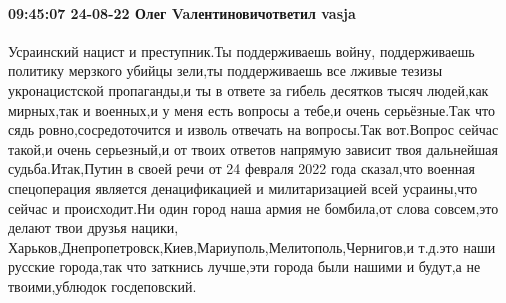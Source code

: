  
 
 
 
 

\paragraph{09:45:07 24-08-22 Олег Vaлентиновичответил vasja}

Усраинский нацист и преступник.Ты поддерживаешь войну, поддерживаешь политику
мерзкого убийцы зели,ты поддерживаешь все лживые тезизы укронацистской
пропаганды,и ты в ответе за гибель десятков тысяч людей,как мирных,так и
военных,и у меня есть вопросы а тебе,и очень серьёзные.Так что сядь
ровно,сосредоточится и изволь отвечать на вопросы.Так вот.Вопрос сейчас такой,и
очень серьезный,и от твоих ответов напрямую зависит твоя дальнейшая
судьба.Итак,Путин в своей речи от 24 февраля 2022 года сказал,что военная
спецоперация является денацификацией и милитаризацией всей усраины,что сейчас и
происходит.Ни один город наша армия не бомбила,от слова совсем,это делают твои
друзья нацики, Харьков,Днепропетровск,Киев,Мариуполь,Мелитополь,Чернигов,и
т.д.это наши русские города,так что заткнись лучше,эти города были нашими и
будут,а не твоими,ублюдок госдеповский.
